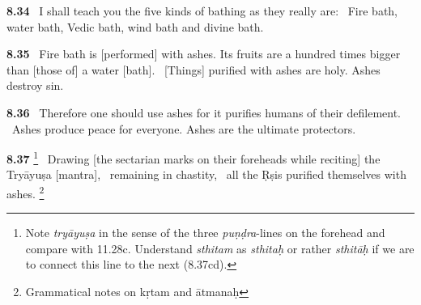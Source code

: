 \documentclass{article}
\newcommand{\skt}[1]{\textit{#1}}
\begin{document}
\textbf{8.34}%
\ I shall teach you the five kinds of bathing as they really are:%
\ Fire bath, water bath, Vedic bath, wind bath and divine bath.%


\textbf{8.35}%
\ Fire bath is [performed] with ashes. Its fruits are a hundred times bigger than [those of] a water [bath].%
\ [Things] purified with ashes are holy. Ashes destroy sin.%


\textbf{8.36}%
\ Therefore one should use ashes for it purifies humans of their defilement.%
\ Ashes produce peace for everyone. Ashes are the ultimate protectors.%


\textbf{8.37}%
\footnote{Note \skt{tryāyuṣa} in the sense of the three \skt{puṇḍra}-lines on the                forehead and compare with 11.28c. Understand \skt{sthitam} as                 \skt{sthitaḥ} or rather \skt{sthitāḥ} if we are to connect this line                to the next (8.37cd). }%
\ Drawing [the sectarian marks on their foreheads while reciting] the Tryāyuṣa [mantra],%
\                                 remaining in chastity,%
\ all the Ṛṣis purified themselves with ashes.%
\footnote{Grammatical notes on kṛtam and ātmanaḥ }%
\end{document}
